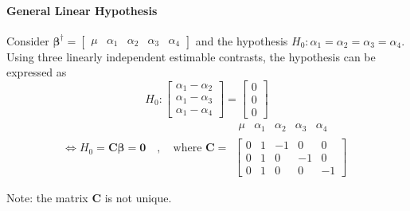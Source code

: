 \documentclass{article}
\begin{document}
\paragraph{General Linear Hypothesis}

Consider $\mathbf{\beta }^{\dagger }=\left[ 
\begin{array}{ccccc}
\mu & \alpha _{1} & \alpha _{2} & \alpha _{3} & \alpha _{4}%
\end{array}%
\right] $ and the hypothesis $H_{0}:\alpha _{1}=\alpha _{2}=\alpha
_{3}=\alpha _{4}$. Using three linearly independent estimable contrasts, the
hypothesis can be expressed as%
\begin{equation*}
H_{0}:\left[ 
\begin{array}{c}
\alpha _{1}-\alpha _{2} \\ 
\alpha _{1}-\alpha _{3} \\ 
\alpha _{1}-\alpha _{4}%
\end{array}%
\right] =\left[ 
\begin{array}{c}
0 \\ 
0 \\ 
0%
\end{array}%
\right]
\end{equation*}%
\begin{equation*}
\Leftrightarrow H_{0}=\mathbf{C\beta }=\mathbf{0\quad ,\quad }\text{where }%
\mathbf{C}=%
\begin{array}{c}
\begin{array}{ccccc}
\mu & \alpha _{1} & \alpha _{2} & \alpha _{3} & \alpha _{4}%
\end{array}
\\ 
\left[ 
\begin{array}{ccccc}
0 & 1 & -1 & 0 & 0 \\ 
0 & 1 & 0 & -1 & 0 \\ 
0 & 1 & 0 & 0 & -1%
\end{array}%
\right]%
\end{array}%
\end{equation*}

Note: the matrix $\mathbf{C}$ is not unique.

\bigskip
\end{document}
